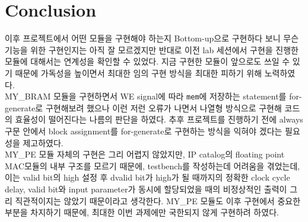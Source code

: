 \documentclass{article}
\newcommand{\orange}[1]{{\color{orange} #1}}
\begin{document}
\section{Conclusion}
\orange{
이후 프로젝트에서 어떤 모듈을 구현해야 하는지 Bottom-up으로 구현하다 보니 무슨 기능을 위한 구현인지는 아직 잘 모르겠지만 반대로 이전 lab 세션에서 구현을 진행한 모듈에 대해서는 연계성을 확인할 수 있었다. 지금 구현한 모듈이 앞으로도 쓰일 수 있기 때문에 가독성을 높이면서 최대한 임의 구현 방식을 최대한 피하기 위해 노력하였다. \\

MY\_BRAM 모듈을 구현하면서 WE signal에 따라 \texttt{mem}에 저장하는 statement를 for-generate로 구현해보려 했으나 이런 저런 오류가 나면서 나열형 방식으로 구현해 코드의 효율성이 떨어진다는 나름의 판단을 하였다. 추후 프로젝트를 진행하기 전에 always 구문 안에서 block assignment를 for-generate로 구현하는 방식을 익혀야 겠다는 필요성을 제고하였다.\\

MY\_PE 모듈 자체의 구현은 그리 어렵지 않았지만, IP catalog의 floating point MAC모듈의 내부 구조를 모르기 때문에, testbench를 작성하는데 어려움을 겪었는데, 이는 valid bit의 high 설정 후 dvalid bit가 high가 될 때까지의 정확한 clock cycle delay, valid bit와 input parameter가 동시에 할당되었을 때의 비정상적인 출력이 그리 직관적이지는 않았기 때문이라고 생각한다. MY\_PE 모듈도 이후 구현에서 중요한 부분을 차지하기 때문에, 최대한 이번 과제에만 국한되지 않게 구현하려 하였다. 
}



\end{document}
